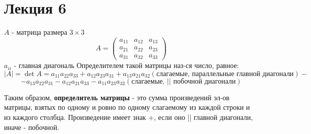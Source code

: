 \section{Лекция 6}

\begin{definition}
$A$ - матрица размера $3 \times 3$ 
\[
  A = \begin{pmatrix}a_{11} & a_{12} & a_{13} \\ a_{21} & a_{22} & a_{23} \\ a_{31} & a_{32} & a_{33} \end{pmatrix}
\]
$a_{ii}$ - главная диагональ
Определителем такой матрицы наз-ся число, равное:
\[
\left|A\right| = \det A = a_{11} a_{22} a_{33} + a_{12} a_{23} a_{31} + a_{13}a_{21}a_{32} \left(\text{слагаемые, параллельные главной диагонали}\right) -
\]
\[
  - a_{13}a_{22}a_{31} - a_{12}a_{21}a_{33} - a_{11}a_{23}a_{32} \left(\text{слагаемые, || побочной диагонали}\right)
\]

Таким образом, \textbf{определитель матрицы} -  это сумма произведений эл-ов матрицы, взятых по одному и ровно по одному слагаемому из каждой строки и из каждого столбца. Произведение имеет знак +, если оно || главной диагонали, иначе - побочной. 
\end{definition}

